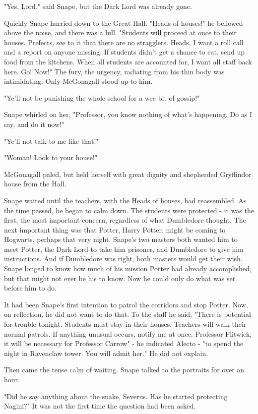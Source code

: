 \documentclass[a4paper,11pt]{article}
\begin{document}
"Yes, Lord," said Snape, but the Dark Lord was already gone.

Quickly Snape hurried down to the Great Hall. "Heads of houses!" he bellowed above the noise, and there was a lull. "Students will proceed at once to their houses. Prefects, see to it that there are no stragglers. Heads, I want a roll call and a report on anyone missing. If students didn't get a chance to eat, send up food from the kitchens. When all students are accounted for, I want all staff back here. Go! Now!" The fury, the urgency, radiating from his thin body was intimidating. Only McGonagall stood up to him.

"Ye'll not be punishing the whole school for a wee bit of gossip!"

Snape whirled on her, "Professor, you know nothing of what's happening. Do as I say, and do it now!"

"Ye'll not talk to me like that!"

"Woman! Look to your house!"

McGonagall paled, but held herself with great dignity and shepherded Gryffindor house from the Hall.

Snape waited until the teachers, with the Heads of houses, had reassembled. As the time passed, he began to calm down. The students were protected - it was the first, the most important concern, regardless of what Dumbledore thought. The next important thing was that Potter, Harry Potter, might be coming to Hogwarts, perhaps that very night. Snape's two masters both wanted him to meet Potter, the Dark Lord to take him prisoner, and Dumbledore to give him instructions. And if Dumbledore was right, both masters would get their wish. Snape longed to know how much of his mission Potter had already accomplished, but that might not ever be his to know. Now he could only do what was set before him to do.

It had been Snape's first intention to patrol the corridors and stop Potter. Now, on reflection, he did not want to do that. To the staff he said, "There is potential for trouble tonight. Students must stay in their houses. Teachers will walk their normal patrols. If anything unusual occurs, notify me at once. Professor Flitwick, it will be necessary for Professor Carrow" - he indicated Alecto - "to spend the night in Ravenclaw tower. You will admit her." He did not explain.

Then came the tense calm of waiting. Snape talked to the portraits for over an hour.

"Did he say anything about the snake, Severus. Has he started protecting Nagini?" It was not the first time the question had been asked.
\end{document}
